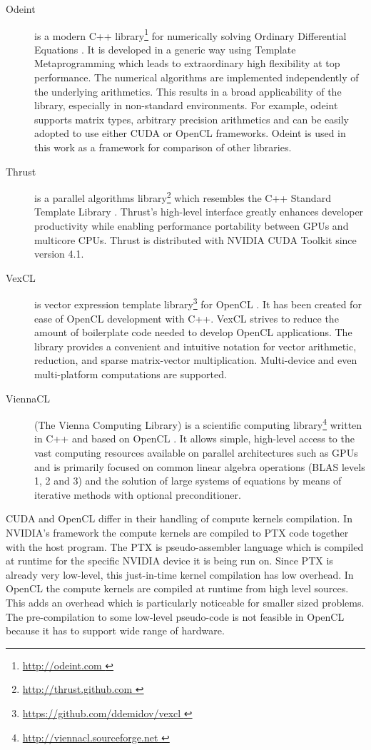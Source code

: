 \documentclass[1p]{elsarticle}
\begin{document}
\begin{description}
    \item[Odeint] is a modern C++ library\footnote{ \href{ http://odeint.com }{
	http://odeint.com } } for numerically solving Ordinary Differential
	Equations \cite{OdeintRef1, OdeintRef2}. It is developed in a generic
	way using Template Metaprogramming which leads to extraordinary high
	flexibility at top performance. The numerical algorithms are
	implemented independently of the underlying arithmetics. This results
	in a broad applicability of the library, especially in non-standard
	environments.  For example, odeint supports matrix types, arbitrary
	precision arithmetics and can be easily adopted to use either CUDA or
	OpenCL frameworks.  Odeint is used in this work as a framework for
	comparison of other libraries.
    \item[Thrust] is a parallel algorithms library\footnote{ \href{
	http://thrust.github.com }{ http://thrust.github.com }} which resembles
	the C++ Standard Template Library \cite{ThrustRef}.  Thrust's
	high-level interface greatly enhances developer productivity while
	enabling performance portability between GPUs and multicore CPUs.
	Thrust is distributed with NVIDIA CUDA Toolkit since version 4.1.
    \item[VexCL] is vector expression template
	library\footnote{ \href{ https://github.com/ddemidov/vexcl }{
	https://github.com/ddemidov/vexcl }} for OpenCL \cite{VexCLRef}. It has
	been created for ease of OpenCL development with C++.  VexCL strives to
	reduce the amount of boilerplate code needed to develop OpenCL
	applications. The library provides a convenient and intuitive notation
	for vector arithmetic, reduction, and sparse matrix-vector
	multiplication.  Multi-device and even multi-platform computations are
	supported.
    \item[ViennaCL] (The Vienna Computing Library) is a scientific computing
	library\footnote{ \href{ http://viennacl.sourceforge.net }{
	http://viennacl.sourceforge.net }} written in C++ and based on OpenCL
	\cite{ViennaCLRef}. It allows simple, high-level access to the vast
	computing resources available on parallel architectures such as GPUs
	and is primarily focused on common linear algebra operations (BLAS
	levels 1, 2 and 3) and the solution of large systems of equations by
	means of iterative methods with optional preconditioner.
\end{description}

CUDA and OpenCL differ in their handling of compute kernels compilation. In
NVIDIA's framework the compute kernels are compiled to PTX code together with
the host program. The PTX is pseudo-assembler language which is compiled at
runtime for the specific NVIDIA device it is being run on. Since PTX is already
very low-level, this just-in-time kernel compilation has low overhead. In
OpenCL the compute kernels are compiled at runtime from high level sources.
This adds an overhead which is particularly noticeable for smaller sized
problems. The pre-compilation to some low-level pseudo-code is not feasible in
OpenCL because it has to support wide range of hardware.
\end{document}
